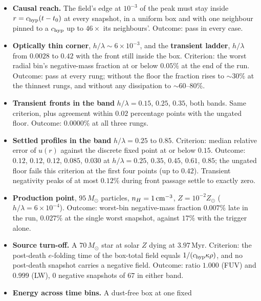 \begin{itemize}
    float32 underflow of Section~\ref{sec:fuv-moments} directly: median
    relative error $0.5014$ and $0.5551$ before evaluating the flux norm
    in double, $0.0074$ and $0.0104$ after, on the same check.
  \item \textbf{Causal reach.} The field's edge at $10^{-3}$ of the peak
    must stay inside $r = c_{\rm hyp}(t - t_0)$ at every snapshot, in a
    uniform box and with one neighbour pinned to a $c_{\rm hyp}$ up to
    $46\times$ its neighbours'. Outcome: pass in every case.
  \item \textbf{Optically thin corner}, $h/\lambda\sim6\times10^{-3}$,
    and the \textbf{transient ladder}, $h/\lambda$ from $0.0028$ to
    $0.42$ with the front still inside the box. Criterion: the worst
    radial bin's negative-mass fraction at or below $0.05\%$ at the end
    of the run. Outcome: pass at every rung; without the floor the
    fraction rises to $\sim30\%$ at the thinnest rungs, and without any
    dissipation to $\sim60$--$80\%$.
  \item \textbf{Transient fronts in the band} $h/\lambda = 0.15$,
    $0.25$, $0.35$, both bands. Same criterion, plus agreement within
    $0.02$ percentage points with the ungated floor. Outcome: $0.0000\%$
    at all three rungs.
  \item \textbf{Settled profiles in the band} $h/\lambda = 0.25$ to
    $0.85$. Criterion: median relative error of $u(r)$ against the
    discrete fixed point at or below $0.15$. Outcome: $0.12$, $0.12$,
    $0.12$, $0.085$, $0.030$ at $h/\lambda = 0.25$, $0.35$, $0.45$,
    $0.61$, $0.85$; the ungated floor fails this criterion at the first
    four points (up to $0.42$). Transient negativity peaks of at most
    $0.12\%$ during front passage settle to exactly zero.
  \item \textbf{Production point}, $95\,M_\odot$ particles, $n_H =
    1\,{\rm cm^{-3}}$, $Z = 10^{-2}Z_\odot$ ($h/\lambda = 6\times10^{-4}$).
    Outcome: worst-bin negative-mass fraction $0.007\%$ late in the run,
    $0.027\%$ at the single worst snapshot, against $17\%$ with the
    trigger alone.
  \item \textbf{Source turn-off.} A $70\,M_\odot$ star at solar $Z$
    dying at $3.97$\,Myr. Criterion: the post-death $e$-folding time of
    the box-total field equals $1/(c_{\rm hyp}\kappa\rho)$, and no
    post-death snapshot carries a negative field. Outcome: ratio $1.000$
    (FUV) and $0.999$ (LW), $0$ negative snapshots of $67$ in either
    band.
  \item \textbf{Energy across time bins.} A dust-free box at one fixed

\end{itemize}
